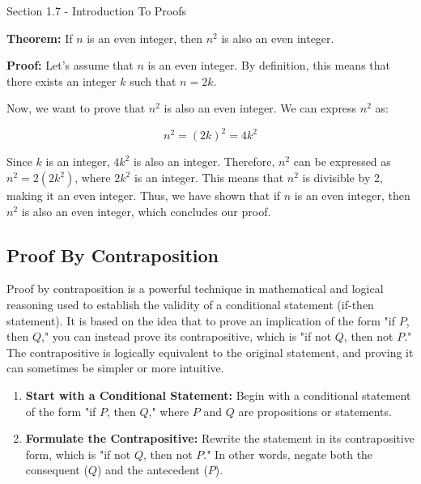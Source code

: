 \begin{notes}{Section 1.7 - Introduction To Proofs}
    \begin{highlight}
        \textbf{Theorem:} If \(n\) is an even integer, then \(n^2\) is also an even integer. \vspace*{1em}


        \textbf{Proof:} Let's assume that \(n\) is an even integer. By definition, this means that there exists an integer \(k\) such that \(n = 2k\). 
        
        Now, we want to prove that \(n^2\) is also an even integer. We can express \(n^2\) as:
        
        \[n^2 = (2k)^2 = 4k^2\]

        
        Since \(k\) is an integer, \(4k^2\) is also an integer. Therefore, \(n^2\) can be expressed as \(n^2 = 2(2k^2)\), where \(2k^2\) is an integer. This means that \(n^2\) is divisible by 2, making it an 
        even integer. Thus, we have shown that if \(n\) is an even integer, then \(n^2\) is also an even integer, which concludes our proof.
    \end{highlight}

    \subsection*{Proof By Contraposition}

    Proof by contraposition is a powerful technique in mathematical and logical reasoning used to establish the validity of a conditional statement (if-then statement). It is based on the idea that to prove an 
    implication of the form "if $P$, then $Q$," you can instead prove its contrapositive, which is "if not $Q$, then not $P$." The contrapositive is logically equivalent to the original statement, and proving 
    it can sometimes be simpler or more intuitive.

    \begin{enumerate}
        \item \textbf{Start with a Conditional Statement:} Begin with a conditional statement of the form "if $P$, then $Q$," where $P$ and $Q$ are propositions or statements.
        
        \item \textbf{Formulate the Contrapositive:} Rewrite the statement in its contrapositive form, which is "if not $Q$, then not $P$." In other words, negate both the consequent ($Q$) and the antecedent ($P$).
        

\end{enumerate}
\end{notes}

